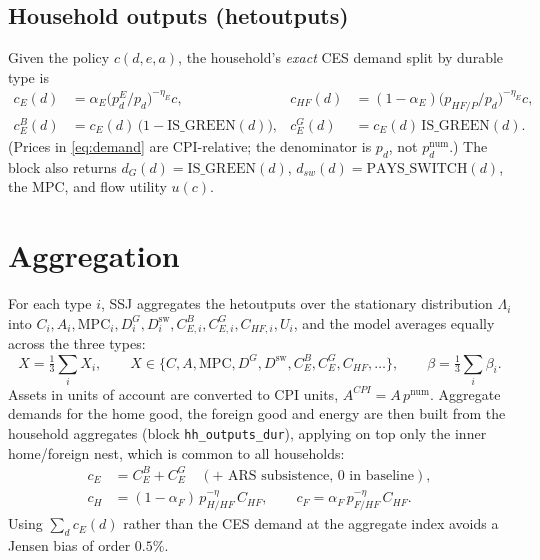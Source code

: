 \documentclass[11pt]{article}
\newcommand{\num}{\mathrm{num}}
\newcommand{\dsw}{D^{\mathrm{sw}}}
\newcommand{\DG}{D^{G}}
\newcommand{\pE}{p^{E}}
\begin{document}
\subsection{Household outputs (hetoutputs)}\label{sec:hetout}

Given the policy $c(d,e,a)$, the household's \emph{exact} CES demand split by
durable type is
\begin{align}
c_E(d) &= \alpha_E\bigl(\pE_d/p_d\bigr)^{-\eta_E} c, &
c_{HF}(d) &= (1-\alpha_E)\bigl(p_{HF/P}/p_d\bigr)^{-\eta_E} c, \label{eq:demand}\\
c_E^{B}(d) &= c_E(d)\,\bigl(1-\mathrm{IS\_GREEN}(d)\bigr), &
c_E^{G}(d) &= c_E(d)\,\mathrm{IS\_GREEN}(d).
\end{align}
(Prices in \eqref{eq:demand} are CPI-relative; the denominator is $p_d$, not
$p_d^{\num}$.) The block also returns $d_G(d)=\mathrm{IS\_GREEN}(d)$,
$d_{sw}(d)=\mathrm{PAYS\_SWITCH}(d)$, the MPC, and flow utility $u(c)$.

\section{Aggregation}\label{sec:agg}

For each type $i$, SSJ aggregates the hetoutputs over the stationary
distribution $\Lambda_i$ into $C_i,A_i,\mathrm{MPC}_i,\DG_i,\dsw_i,
C^{B}_{E,i},C^{G}_{E,i},C_{HF,i},U_i$, and the model averages equally across the
three types:
\begin{equation}
X=\tfrac13\textstyle\sum_i X_i,\qquad
X\in\{C,A,\mathrm{MPC},\DG,\dsw,C^{B}_{E},C^{G}_{E},C_{HF},\ldots\},
\qquad \beta=\tfrac13\textstyle\sum_i\beta_i .
\end{equation}
Assets in units of account are converted to CPI units, $A^{CPI}=A\,p^{\num}$.
Aggregate demands for the home good, the foreign good and energy are then built
from the household aggregates (block \texttt{hh\_outputs\_dur}), applying on top
only the inner home/foreign nest, which is common to all households:
\begin{align}
c_E &= C^{B}_{E}+C^{G}_{E} \quad(+\text{ ARS subsistence, }0\text{ in baseline}),\\
c_H &= (1-\alpha_F)\,p_{H/HF}^{-\eta}\,C_{HF}, \qquad
c_F = \alpha_F\,p_{F/HF}^{-\eta}\,C_{HF}. \label{eq:cHcF}
\end{align}
Using $\sum_d c_E(d)$ rather than the CES demand at the aggregate index avoids a
Jensen bias of order $0.5\%$.
\end{document}
